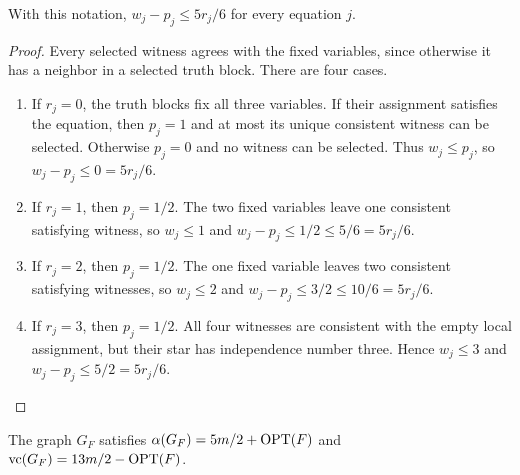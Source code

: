 \begin{lemma}
\label{lem:xor-witness-excess}
With this notation, $w_j-p_j\le5r_j/6$ for every equation $j$.
\end{lemma}

\begin{proof}
Every selected witness agrees with the fixed variables, since
otherwise it has a neighbor in a selected truth block. There are
four cases.
\begin{enumerate}
\setlength{\itemsep}{0pt}
\setlength{\parsep}{0pt}
\setlength{\topsep}{2pt}
\setlength{\partopsep}{0pt}
 \item If $r_j=0$, the truth blocks fix all three variables. If their
   assignment satisfies the equation, then $p_j=1$ and at most its
   unique consistent witness can be selected. Otherwise $p_j=0$ and
   no witness can be selected. Thus $w_j\le p_j$, so
   $w_j-p_j\le0=5r_j/6$.
 \item If $r_j=1$, then $p_j=1/2$. The two fixed variables leave one
   consistent satisfying witness, so $w_j\le1$ and
   $w_j-p_j\le1/2\le5/6=5r_j/6$.
 \item If $r_j=2$, then $p_j=1/2$. The one fixed variable leaves two
   consistent satisfying witnesses, so $w_j\le2$ and
   $w_j-p_j\le3/2\le10/6=5r_j/6$.
 \item If $r_j=3$, then $p_j=1/2$. All four witnesses are consistent
   with the empty local assignment, but their star has independence
   number three. Hence $w_j\le3$ and $w_j-p_j\le5/2=5r_j/6$.
\end{enumerate}
\end{proof}

\begin{lemma}\label{lem:xor-cover}
The graph $G_F$ satisfies $\alpha(G_F)=5m/2+\operatorname{OPT}(F)$ and
$\operatorname{vc}(G_F)=13m/2-\operatorname{OPT}(F)$.
\end{lemma}


